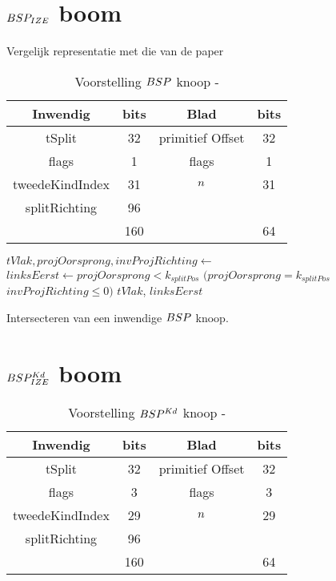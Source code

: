 \section{$BSP_{IZE}$ boom}
\label{sec:h4-bspize}
Vergelijk representatie met die van de paper
\begin{table}
        \centering
        \begin{tabular}{@{}|c|c|c|c|@{}} \toprule      
            Inwendig & bits & Blad & bits \\ \midrule
            tSplit & 32 & primitief Offset & 32 \\
            flags  & 1  &  flags   & 1    \\
            tweedeKindIndex & 31 & $n$ & 31 \\
            splitRichting & 96 &  &  \\ \hline \hline
            & 160 & & 64    \\ \bottomrule
        \end{tabular}
    \caption[Voorstelling $\symBSP$ knoop]{Voorstelling $\symBSP$ knoop - \small }
    \label{tab:voorstelling-bsp-knoop}
\end{table}   

  
\begin{dutchalgorithm}
    \begin{algorithmic}       
            \State $tVlak, projOorsprong, invProjRichting \gets $ 
            \State $linksEerst \gets projOorsprong < k_{splitPos}$ \Or $(projOorsprong = k_{splitPos}$ \And $invProjRichting \leq 0)$
            \State \Return $tVlak$, $linksEerst$
        \EndFunction
    \end{algorithmic}
    \caption{Intersecteren van een inwendige $\symBSP$ knoop.}
\end{dutchalgorithm}

\section{$BSP^{Kd}_{IZE}$ boom}
\label{sec:h4-bspizefastkd}
\begin{table}
        \centering
        \begin{tabular}{@{}|c|c|c|c|@{}} \toprule      
            Inwendig & bits & Blad & bits \\ \midrule
            tSplit & 32 & primitief Offset & 32 \\
            flags  & 3  &  flags   & 3   \\
            tweedeKindIndex & 29 & $n$ & 29 \\
            splitRichting & 96 &  &  \\ \hline \hline
            & 160 & & 64    \\ \bottomrule
        \end{tabular}
    \caption[Voorstelling $\symBSPKd$ knoop]{Voorstelling $\symBSPKd$ knoop - \small }
    \label{tab:voorstelling-bspkd-knoop}
\end{table}   


